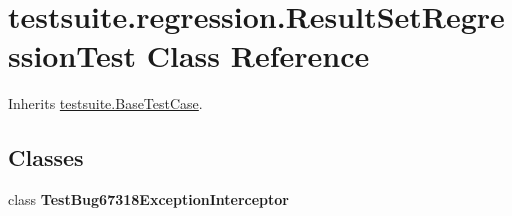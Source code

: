 \hypertarget{classtestsuite_1_1regression_1_1_result_set_regression_test}{}\section{testsuite.\+regression.\+Result\+Set\+Regression\+Test Class Reference}
\label{classtestsuite_1_1regression_1_1_result_set_regression_test}


Inherits \mbox{\hyperlink{classtestsuite_1_1_base_test_case}{testsuite.\+Base\+Test\+Case}}.

\subsection*{Classes}
\begin{DoxyCompactItemize}
\item 
class {\bfseries Test\+Bug67318\+Exception\+Interceptor}
\end{DoxyCompactItemize}
